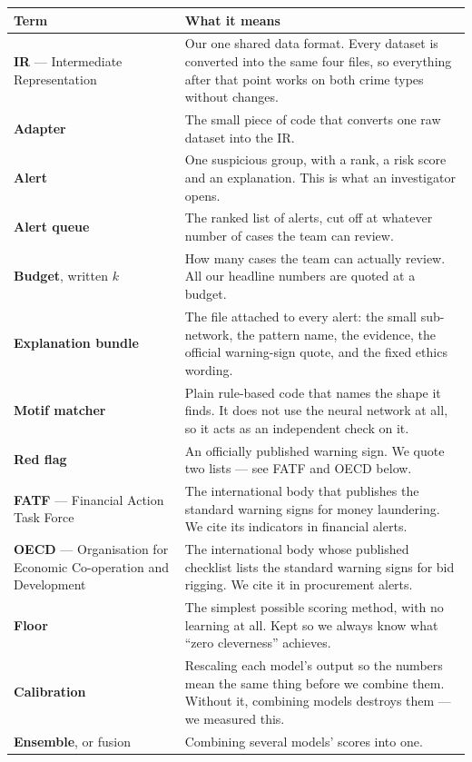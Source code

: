 \documentclass[11pt,a4paper]{article}
\begin{document}
\begin{longtable}{@{}p{4.1cm}p{11.4cm}@{}}
\toprule
\textbf{Term} & \textbf{What it means} \\
\midrule
\endhead
\textbf{IR} --- Intermediate Representation & Our one shared data format. Every
dataset is converted into the same four files, so everything after that point
works on both crime types without changes. \\
\textbf{Adapter} & The small piece of code that converts one raw dataset into the
IR. \\
\textbf{Alert} & One suspicious group, with a rank, a risk score and an
explanation. This is what an investigator opens. \\
\textbf{Alert queue} & The ranked list of alerts, cut off at whatever number of
cases the team can review. \\
\textbf{Budget}, written $k$ & How many cases the team can actually review. All
our headline numbers are quoted at a budget. \\
\textbf{Explanation bundle} & The file attached to every alert: the small
sub-network, the pattern name, the evidence, the official warning-sign quote, and
the fixed ethics wording. \\
\textbf{Motif matcher} & Plain rule-based code that names the shape it finds. It
does not use the neural network at all, so it acts as an independent check on
it. \\
\textbf{Red flag} & An officially published warning sign. We quote two lists ---
see FATF and OECD below. \\
\textbf{FATF} --- Financial Action Task Force & The international body that
publishes the standard warning signs for money laundering. We cite its indicators
in financial alerts. \\
\textbf{OECD} --- Organisation for Economic Co-operation and Development & The
international body whose published checklist lists the standard warning signs for
bid rigging. We cite it in procurement alerts. \\
\textbf{Floor} & The simplest possible scoring method, with no learning at all.
Kept so we always know what ``zero cleverness'' achieves. \\
\textbf{Calibration} & Rescaling each model's output so the numbers mean the same
thing before we combine them. Without it, combining models destroys them --- we
measured this. \\
\textbf{Ensemble}, or fusion & Combining several models' scores into one. \\

\end{longtable}
\end{document}
